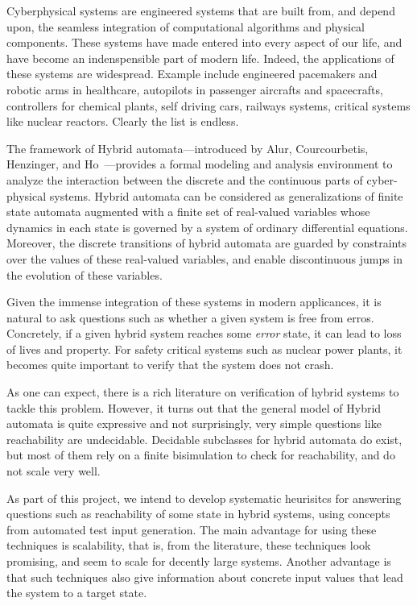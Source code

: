 Cyberphysical systems are engineered systems that are built from, 
and depend upon, the seamless integration of computational algorithms and physical components.
These systems have made entered into every aspect of our life, and have become an
indenspensible part of modern life.
Indeed, the applications of these systems are widespread.
Example include engineered pacemakers and robotic arms in healthcare, autopilots in
passenger aircrafts and spacecrafts, controllers for chemical plants,
self driving cars, railways systems, critical systems like
nuclear reactors. Clearly the list is endless.

  The framework of Hybrid automata---introduced by Alur, Courcourbetis,
  Henzinger, and Ho~\cite{ACH92}---provides a formal modeling and analysis environment to
  analyze the interaction between the discrete and the continuous parts of
  cyber-physical systems. 
  Hybrid automata can be considered as generalizations of finite state automata
  augmented with a finite set of real-valued variables whose dynamics in each
  state is governed by a system of ordinary differential equations. 
  Moreover, the discrete transitions of hybrid automata are guarded by
  constraints over the values of these real-valued variables, and enable
  discontinuous jumps in the evolution of these variables.
  


Given the immense integration of these systems in modern applicances,
it is natural to ask questions such as whether a given system is free from erros.
Concretely, if a given hybrid system reaches some \emph{error} state, it can lead 
to loss of lives and property. For safety critical systems such as nuclear power plants,
it becomes quite important to verify that the system does not crash. 

As one can expect, there is a rich literature on verification
of hybrid systems to tackle this problem. 
However, it turns out that the  general model of Hybrid automata is quite expressive
and not surprisingly, very simple questions like reachability are undecidable. 
Decidable subclasses for hybrid automata do exist, but most of them rely on a finite bisimulation
to check for reachability, and do not scale very well.

As part of this project, we intend to develop systematic heurisitcs 
for answering  questions such as reachability of some state 
in hybrid systems, using concepts from automated test input generation.
The main advantage for using these techniques is scalability, that is, from
the literature, these techniques look promising, and seem to scale for decently large systems.
Another advantage is that such techniques also give information about
concrete input values that lead the system to a target state.

